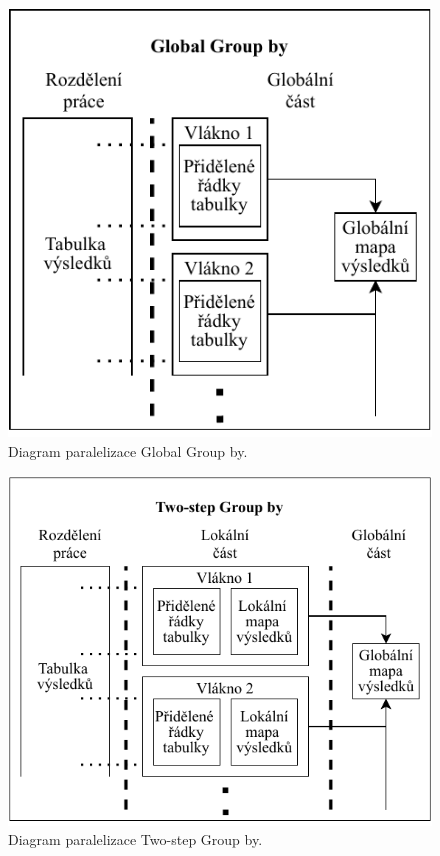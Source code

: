 \begin{figure}[!htp]
\includegraphics{../img/diaGlobalGr.pdf}\centering
\caption{Diagram paralelizace Global Group by.}
\label{figure.diaGlobalGr}
\end{figure}

\begin{figure}[!htp]
\includegraphics{../img/diaTwoGr.pdf}\centering
\caption{Diagram paralelizace Two-step Group by.}
\label{figure.diaTwoGr}
\end{figure}

